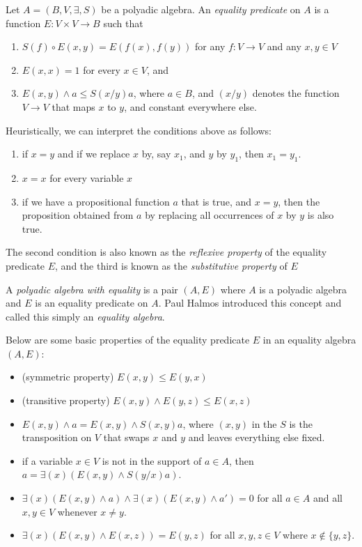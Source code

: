 \documentclass[12pt]{article}
\begin{document}
Let $A=(B,V,\exists,S)$ be a polyadic algebra.  An \emph{equality predicate} on $A$ is a function $E:V\times V\to B$ such that
\begin{enumerate}
\item $S(f)\circ E(x,y) = E(f(x),f(y))$ for any $f:V\to V$ and any $x,y\in V$
\item $E(x,x)=1$ for every $x\in V$, and
\item $E(x,y)\wedge a\le S(x/y)a$, where $a\in B$, and $(x/y)$ denotes the function $V\to V$ that maps $x$ to $y$, and constant everywhere else.
\end{enumerate}
Heuristically, we can interpret the conditions above as follows: 
\begin{enumerate}
\item if $x=y$ and if we replace $x$ by, say $x_1$, and $y$ by $y_1$, then $x_1=y_1$.  
\item $x=x$ for every variable $x$
\item if we have a propositional function $a$ that is true, and $x=y$, then the proposition obtained from $a$ by replacing all occurrences of $x$ by $y$ is also true.
\end{enumerate}
The second condition is also known as the \emph{reflexive property} of the equality predicate $E$, and the third is known as the \emph{substitutive property} of $E$

A \emph{polyadic algebra with equality} is a pair $(A,E)$ where $A$ is a polyadic algebra and $E$ is an equality predicate on $A$.  Paul Halmos introduced this concept and called this simply an \emph{equality algebra}.

Below are some basic properties of the equality predicate $E$ in an equality algebra $(A,E)$:
\begin{itemize}
\item (symmetric property) $E(x,y)\le E(y,x)$
\item (transitive property) $E(x,y)\wedge E(y,z)\le E(x,z)$
\item $E(x,y) \wedge a = E(x,y) \wedge S(x,y)a $, where $(x,y)$ in the $S$ is the transposition on $V$ that swaps $x$ and $y$ and leaves everything else fixed.
\item if a variable $x\in V$ is not in the support of $a\in A$, then $a=\exists(x) (E(x,y)\wedge S(y/x)a)$.
\item $\exists(x)(E(x,y)\wedge a)\wedge \exists(x)(E(x,y)\wedge a')=0$ for all $a\in A$ and all $x,y\in V$ whenever $x\ne y$.
\item $\exists(x)(E(x,y)\wedge E(x,z))=E(y,z)$ for all $x,y,z\in V$ where $x\notin \lbrace y,z\rbrace$.
\end{itemize}
\end{document}
